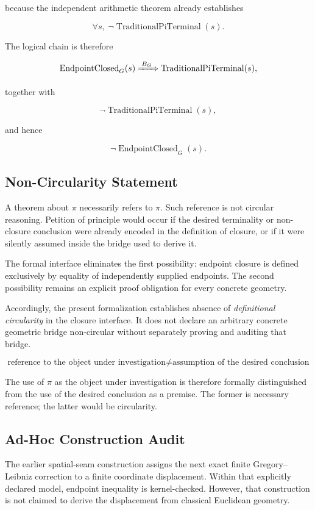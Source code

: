 \documentclass[11pt,a4paper]{article}
\begin{document}
because the independent arithmetic theorem already establishes

\[
\forall s,\;
\neg\operatorname{TraditionalPiTerminal}(s).
\]

The logical chain is therefore

\[
\operatorname{EndpointClosed}_{G}(s)
\xRightarrow{\;B_G\;}
\operatorname{TraditionalPiTerminal}(s),
\]

together with

\[
\neg\operatorname{TraditionalPiTerminal}(s),
\]

and hence

\[
\neg\operatorname{EndpointClosed}_{G}(s).
\]

\subsection*{Non-Circularity Statement}

A theorem about \(\pi\) necessarily refers to \(\pi\). Such reference is
not circular reasoning. Petition of principle would occur if the desired
terminality or non-closure conclusion were already encoded in the
definition of closure, or if it were silently assumed inside the bridge
used to derive it.

The formal interface eliminates the first possibility: endpoint closure
is defined exclusively by equality of independently supplied endpoints.
The second possibility remains an explicit proof obligation for every
concrete geometry.

Accordingly, the present formalization establishes absence of
\emph{definitional circularity} in the closure interface. It does not
declare an arbitrary concrete geometric bridge non-circular without
separately proving and auditing that bridge.

\[
\boxed{
\text{reference to the object under investigation}
\neq
\text{assumption of the desired conclusion}
}
\]

The use of \(\pi\) as the object under investigation is therefore
formally distinguished from the use of the desired conclusion as a
premise. The former is necessary reference; the latter would be
circularity.

\subsection*{Ad-Hoc Construction Audit}

The earlier spatial-seam construction assigns the next exact finite
Gregory--Leibniz correction to a finite coordinate displacement.
Within that explicitly declared model, endpoint inequality is
kernel-checked. However, that construction is not claimed to derive
the displacement from classical Euclidean geometry.
\end{document}
